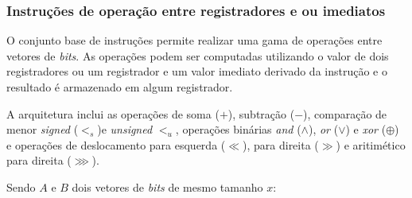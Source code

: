 \subsubsection{Instruções de operação entre registradores e ou imediatos}
\label{ssec:regimm}

    O conjunto base de instruções permite realizar uma gama de operações entre vetores de \emph{bits}. As operações podem ser
    computadas utilizando o valor de dois registradores ou um registrador e um valor imediato derivado da instrução e o resultado
    é armazenado em algum registrador.

    A arquitetura inclui as operações de soma ($+$), subtração ($-$), comparação de menor \emph{signed} ($<_s$)e \emph{unsigned} $<_u$,
    operações binárias \emph{and} ($\land$), \emph{or} ($\lor$) e \emph{xor} ($\oplus$) e operações de deslocamento para esquerda
    ($\ll$), para direita ($\gg$) e aritimético para direita ($\ggg$).

    Sendo $A$ e $B$ dois vetores de \emph{bits} de mesmo tamanho $x$:

